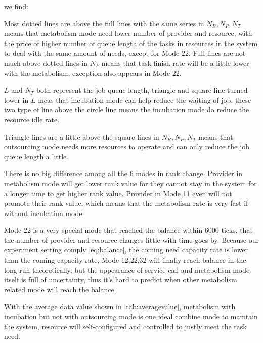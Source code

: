 we find: \begin{asparaenum}[1)]
\item Most dotted lines are above the full lines with the same series in $N_R,N_P,N_T$ means that metabolism mode need lower number of provider and resource, with the price of higher number of queue length of the tasks in resources in the system to deal with the same amount of needs, except for Mode 22. Full lines are not much above dotted lines in $N_F$ means that task finish rate will be a little lower with the metabolism, exception also appears in Mode 22. 
\item $L$ and $N_T$ both represent the job queue length, triangle and square line turned lower in $L$ meas that incubation mode can help reduce the waiting of job, these two type of line above the circle line means the incubation mode do reduce the resource idle rate.
\item Triangle lines are a little above the square lines in $N_R,N_P,N_T$ means that outsourcing mode needs more resources to operate and can only reduce the job queue length a little.
\item There is no big difference among all the 6 modes in rank change. Provider in metabolism mode will get lower rank value for they cannot stay in the system for a longer time to get higher rank value. Provider in Mode 11 even will not promote their rank value, which means that the metabolism rate is very fast if without incubation mode.
\item Mode 22 is a very special mode that reached the balance within 6000 ticks, that the number of provider and resource changes little with time goes by. Because our experiment setting comply \autoref{eq:balance}, the coming need capacity rate is lower than the coming capacity rate, Mode 12,22,32 will finally reach balance in the long run theoretically, but the appearance of service-call and metabolism mode itself is full of uncertainty, thus it's hard to predict when other metabolism related mode will reach the balance.
\item With the average data value shown in \autoref{tab:averagevalue}, metabolism with incubation but not with outsourcing mode is one ideal combine mode to maintain the system, resource will self-configured and controlled to justly meet the task need.
\end{asparaenum}

